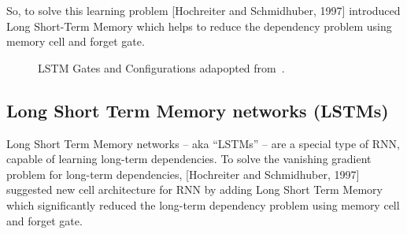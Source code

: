  So, to solve this learning problem [Hochreiter and Schmidhuber, 1997] introduced Long Short-Term Memory which helps to reduce the dependency problem using memory cell and forget gate.
\begin{figure}[!t]
  \centering
\caption{LSTM Gates and Configurations adapopted from~\cite{colah}.}
\end{figure}%

\subsection{Long Short Term Memory networks (LSTMs)}\label{Sec:LSTM}


Long Short Term Memory networks – aka “LSTMs” – are a special type of RNN, capable of learning long-term dependencies. To solve the vanishing gradient problem for long-term dependencies, [Hochreiter and Schmidhuber, 1997]\cite{Hochreiter} suggested new cell architecture for RNN by adding Long Short Term Memory which significantly reduced the long-term dependency problem using memory cell and forget gate.

